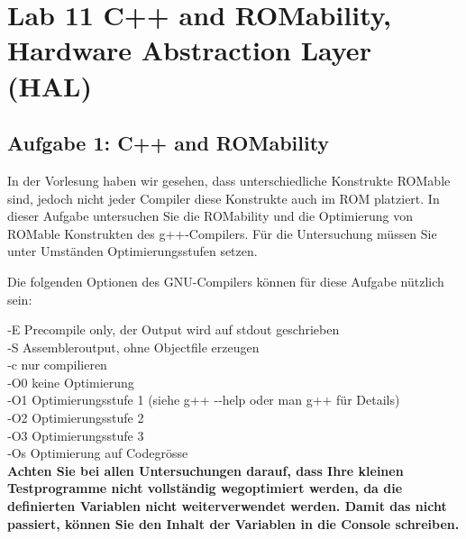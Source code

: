 \section{Lab 11 C++ and ROMability, Hardware Abstraction Layer (HAL)}
\subsection{Aufgabe 1: C++ and ROMability}

In der Vorlesung haben wir gesehen, dass unterschiedliche Konstrukte ROMable sind, jedoch nicht jeder Compiler diese Konstrukte auch im ROM platziert. In dieser Aufgabe untersuchen Sie die ROMability und die Optimierung von ROMable Konstrukten des g++-Compilers. Für die Untersuchung müssen Sie unter Umständen Optimierungsstufen setzen.

Die folgenden Optionen des GNU-Compilers können für diese Aufgabe nützlich sein:

\medskip
\noindent
‐E  \qquad Precompile only, der Output wird auf stdout geschrieben\\
‐S  \qquad Assembleroutput, ohne Objectfile erzeugen\\
‐c \qquad nur compilieren\\
‐O0 \quad keine Optimierung\\
‐O1 \quad Optimierungsstufe 1 (siehe g++ ‐‐help oder man g++ für Details)\\
‐O2 \quad Optimierungsstufe 2\\
‐O3 \quad Optimierungsstufe 3\\
‐Os \quad Optimierung auf Codegrösse\\

\textbf{Achten Sie bei allen Untersuchungen darauf, dass Ihre kleinen Testprogramme nicht vollständig wegoptimiert werden, da die definierten Variablen nicht weiterverwendet werden. Damit das nicht passiert, können Sie den Inhalt der Variablen in die Console schreiben.}

